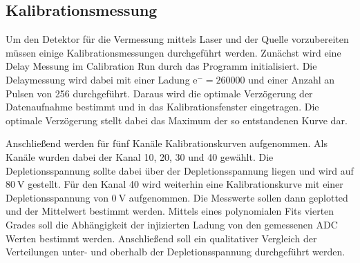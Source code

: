 \subsection{Kalibrationsmessung}

Um den Detektor für die Vermessung mittels Laser und der Quelle vorzubereiten müssen einige Kalibrationsmessungen durchgeführt werden.
Zunächst wird eine Delay Messung im Calibration Run durch das Programm initialisiert.
Die Delaymessung wird dabei mit einer Ladung $\mathup{e}^- = 260000$ und einer Anzahl an Pulsen von 256 durchgeführt.
Daraus wird die optimale Verzögerung der Datenaufnahme bestimmt und in das Kalibrationsfenster eingetragen.
Die optimale Verzögerung stellt dabei das Maximum der so entstandenen Kurve dar.

Anschließend werden für fünf Kanäle Kalibrationskurven aufgenommen.
Als Kanäle wurden dabei der Kanal 10, 20, 30 und 40 gewählt.
Die Depletionsspannung sollte dabei über der Depletionsspannung liegen und wird auf $\SI{80}{\volt}$ gestellt.
Für den Kanal 40 wird weiterhin eine Kalibrationskurve mit einer Depletionsspannung von $\SI{0}{\volt}$ aufgenommen.
Die Messwerte sollen dann geplotted und der Mittelwert bestimmt werden.
Mittels eines polynomialen Fits vierten Grades soll die Abhängigkeit der injizierten Ladung von den gemessenen ADC Werten bestimmt werden.
Anschließend soll ein qualitativer Vergleich der Verteilungen unter- und oberhalb der Depletionsspannung durchgeführt werden.
